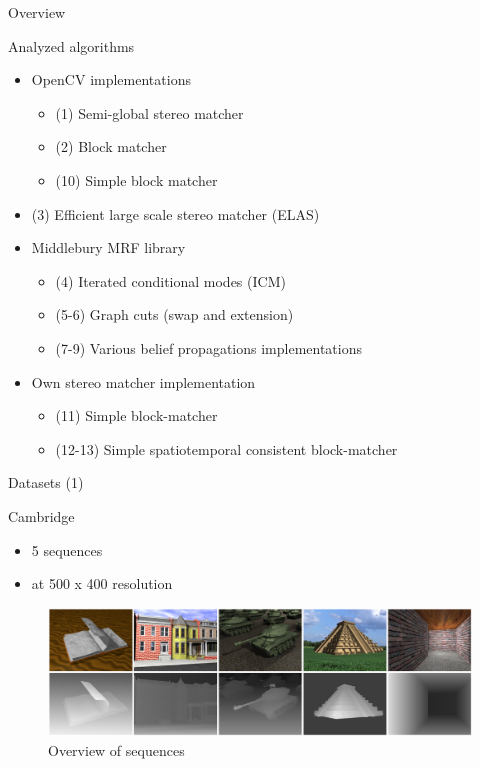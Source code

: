 \documentclass[10pt]{beamer}
\begin{document}
\begin{frame}[fragile]{Overview}
  \begin{block}{Analyzed algorithms}
    \begin{itemize}
      \item OpenCV implementations
      \begin{itemize}
        \item (1) Semi-global stereo matcher
        \item (2) Block matcher
        \item (10) Simple block matcher
      \end{itemize}
      \item (3) Efficient large scale stereo matcher (ELAS)
      \item Middlebury MRF library
      \begin{itemize}
        \item (4) Iterated conditional modes (ICM)
        \item (5-6) Graph cuts (swap and extension)
        \item (7-9) Various belief propagations implementations
      \end{itemize}
      \item Own stereo matcher implementation
      \begin{itemize}
        \item (11) Simple block-matcher
        \item (12-13) Simple spatiotemporal consistent block-matcher
      \end{itemize}
    \end{itemize}
  \end{block}
\end{frame}

\begin{frame}[fragile]{Datasets (1)}
  \begin{block}{Cambridge}
    \begin{itemize}
      \item 5 sequences
      \item at 500 x 400 resolution
    \end{itemize}
    \begin{figure}
    \centering
    \includegraphics[width=1.0\textwidth]{../paper/src/images/dbcgrid-dataset.png}
    \caption{Overview of sequences}
    \end{figure}
  \end{block}
\end{frame}
\end{document}
